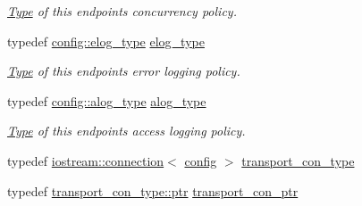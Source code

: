 \begin{DoxyCompactItemize}
\begin{DoxyCompactList}\small\item\em \mbox{\hyperlink{struct_type}{Type}} of this endpoint\textquotesingle{}s concurrency policy. \end{DoxyCompactList}\item 
\mbox{\label{classwebsocketpp_1_1transport_1_1iostream_1_1endpoint_a0aafebd80866c13bef4caa45e48a8ede}} 
typedef \mbox{\hyperlink{classwebsocketpp_1_1log_1_1stub}{config\+::elog\+\_\+type}} \mbox{\hyperlink{classwebsocketpp_1_1transport_1_1iostream_1_1endpoint_a0aafebd80866c13bef4caa45e48a8ede}{elog\+\_\+type}}
\begin{DoxyCompactList}\small\item\em \mbox{\hyperlink{struct_type}{Type}} of this endpoint\textquotesingle{}s error logging policy. \end{DoxyCompactList}\item 
\mbox{\label{classwebsocketpp_1_1transport_1_1iostream_1_1endpoint_af176dc3a44caefab71de271c27873c81}} 
typedef \mbox{\hyperlink{classwebsocketpp_1_1log_1_1stub}{config\+::alog\+\_\+type}} \mbox{\hyperlink{classwebsocketpp_1_1transport_1_1iostream_1_1endpoint_af176dc3a44caefab71de271c27873c81}{alog\+\_\+type}}
\begin{DoxyCompactList}\small\item\em \mbox{\hyperlink{struct_type}{Type}} of this endpoint\textquotesingle{}s access logging policy. \end{DoxyCompactList}\item 
typedef \mbox{\hyperlink{classwebsocketpp_1_1transport_1_1iostream_1_1connection}{iostream\+::connection}}$<$ \mbox{\hyperlink{classconfig}{config}} $>$ \mbox{\hyperlink{classwebsocketpp_1_1transport_1_1iostream_1_1endpoint_a01827f94c5d01289975146f0438ee79b}{transport\+\_\+con\+\_\+type}}
\item 
typedef \mbox{\hyperlink{classwebsocketpp_1_1transport_1_1iostream_1_1connection_a054436e87f6dc4404b13f6131707d2ab}{transport\+\_\+con\+\_\+type\+::ptr}} \mbox{\hyperlink{classwebsocketpp_1_1transport_1_1iostream_1_1endpoint_a709bba4a4e1e2b7829abe4aa55de8078}{transport\+\_\+con\+\_\+ptr}}
\end{DoxyCompactItemize}
